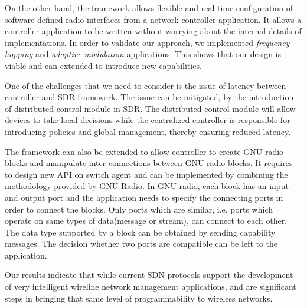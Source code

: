 On the other hand, the \crossflow framework allows flexible and real-time configuration of software defined radio interfaces from a network controller application. It allows a controller application to be written without worrying about the internal details of implementations. In order to validate our approach, we implemented \emph{frequency hopping} and \emph{adaptive modulation} applications. This shows that our design is viable and can extended to introduce new capabilities.

One of the challenges that we need to consider is the issue of latency between controller and SDR framework. The issue can be mitigated, by the introduction of distributed control module in SDR. The distributed control module will allow devices to take local decisions while the centralized controller is responsible for introducing policies and global management, thereby ensuring reduced latency.

The \crossflow framework can also be extended to allow controller to create GNU radio blocks and manipulate inter-connections between GNU radio blocks. It requires to design new API on switch agent and can be implemented by combining the methodology provided by GNU Radio. In GNU radio, each block has an input and output port and the application needs to specify the connecting ports in order to connect the blocks. Only ports which are similar, i.e, ports which operate on same types of data(message or stream), can connect to each other. The data type supported by a block can be obtained by sending capability messages. The decision whether two ports are compatible can be left to the application. 

Our results indicate that while current SDN protocols support the
development of very intelligent wireline network management applications, \aetherflow and \crossflow are
significant steps in bringing that same level of programmability to wireless
networks.
